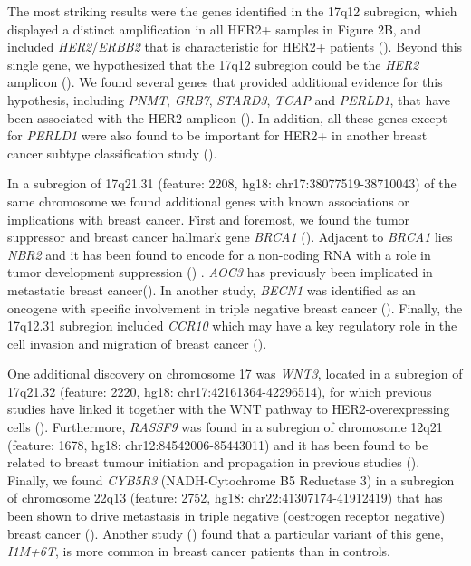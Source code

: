         The most striking results were the genes identified in the 17q12 subregion, which displayed a distinct amplification in all HER2+ samples in Figure 2B, and included \textit{HER2}/\textit{ERBB2} that is characteristic for HER2+ patients (\citealp{Harbeck2019}). Beyond this single gene, we hypothesized that the 17q12 subregion could be the \textit{HER2} amplicon (\citealp{Sahlberg2013}). We found several genes that provided additional evidence for this hypothesis, including \textit{PNMT}, \textit{GRB7}, \textit{STARD3}, \textit{TCAP} and \textit{PERLD1}, that have been associated with the HER2 amplicon (\citealp{Sahlberg2013}). In addition, all these genes except for \textit{PERLD1} were also found to be important for HER2+ in another breast cancer subtype classification study (\citealp{Pan2019}).
        
        In a subregion of 17q21.31 (feature: 2208, hg18: chr17:38077519-38710043) of the same chromosome we found additional genes with known associations or implications with breast cancer. First and foremost, we found the tumor suppressor and breast cancer hallmark gene \textit{BRCA1} (\citealp{Harbeck2019}). Adjacent to \textit{BRCA1} lies \textit{NBR2} and it has been found to encode for a non-coding RNA with a role in tumor development suppression (\citealp{Xiao2016}) . \textit{AOC3} has previously been implicated in metastatic breast cancer(\citealp{Cha2018}). In another study, \textit{BECN1} was identified as an oncogene with specific involvement in triple negative breast cancer (\citealp{Wu2018}). Finally, the 17q12.31 subregion included \textit{CCR10} which may have a key regulatory role in the cell invasion and migration of breast cancer (\citealp{Lin2017}).
    
        One additional discovery on chromosome 17 was \textit{WNT3}, located in a subregion of 17q21.32 (feature: 2220, hg18: chr17:42161364-42296514), for which previous studies have linked it together with the WNT pathway to HER2-overexpressing cells (\citealp{Wu2017}). Furthermore, \textit{RASSF9} was found in a subregion of chromosome 12q21 (feature: 1678, hg18: chr12:84542006-85443011) and it has been found to be related to breast tumour initiation and propagation in previous studies (\citealp{Li2018}). Finally, we found \textit{CYB5R3} (NADH-Cytochrome B5 Reductase 3) in a subregion of chromosome 22q13 (feature: 2752, hg18: chr22:41307174-41912419) that has been shown to drive metastasis in triple negative (oestrogen receptor negative) breast cancer (\citealp{Lund2015}). Another study (\citealp{Blanke2014}) found that a particular variant of this gene, \textit{I1M+6T}, is more common in breast cancer patients than in controls.
        
